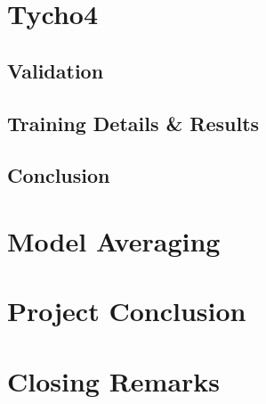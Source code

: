 \documentclass[12pt,a4paper,oneside,oldfontcommands]{memoir}
\begin{document}
\chapter{Tycho4}


\section{Validation}

\section{Training Details & Results}

\section{Conclusion}

\chapter{Model Averaging}


\chapter{Project Conclusion}


\chapter{Closing Remarks}



\appendix

\renewcommand{\bibname}{References}


\end{document}
